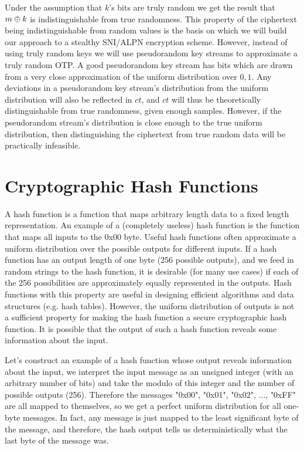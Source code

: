 Under the assumption that $k$'s bits are truly random we get the result that $m\oplus k$ is indistinguishable from true randomness. This property of the ciphertext being indistinguishable from random values is the basis on which we will build our approach to a stealthy \ac{SNI}/\ac{ALPN} encryption scheme. However, instead of using truly random keys we will use pseudorandom key streams to approximate a truly random \ac{OTP}. A good pseudorandom key stream has bits which are drawn from a very close approximation of the uniform distribution over ${0,1}$. Any deviations in a pseudorandom key stream's distribution from the uniform distribution will also be reflected in $ct$, and $ct$ will thus be theoretically distinguishable from true randomness, given enough samples. However, if the pseudorandom stream's distribution is close enough to the true uniform distribution, then distinguishing the ciphertext from true random data will be practically infeasible.

\section{Cryptographic Hash Functions}
A hash function is a function that maps arbitrary length data to a fixed length representation. An example of a (completely useless) hash function is the function that maps all inputs to the 0x00 byte. Useful hash functions often approximate a uniform distribution over the possible outputs for different inputs. If a hash function has an output length of one byte (256 possible outputs), and we feed in random strings to the hash function, it is desirable (for many use cases) if each of the 256 possibilities are approximately equally represented in the outputs. Hash functions with this property are useful in designing efficient algorithms and data structures (e.g. hash tables). However, the uniform distribution of outputs is not a sufficient property for making the hash function a secure cryptographic hash function. It is possible that the output of such a hash function reveals some information about the input.

Let's construct an example of a hash function whose output reveals information about the input, we interpret the input message as an unsigned integer (with an arbitrary number of bits) and take the modulo of this integer and the number of possible outputs (256). Therefore the messages "0x00", "0x01", "0x02", ..., "0xFF" are all mapped to themselves, so we get a perfect uniform distribution for all one-byte messages. In fact, any message is just mapped to the least significant byte of the message, and therefore, the hash output tells us deterministically what the last byte of the message was.

